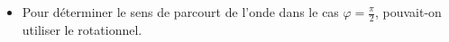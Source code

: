 \documentclass[a4paper, 11pt, hidelinks]{article}
\begin{document}
\begin{itemize}
    \item Pour déterminer le sens de parcourt de l'onde dans le cas $\varphi=\frac{\pi}{2}$, pouvait-on utiliser le rotationnel.
\end{itemize}





























\end{document}
